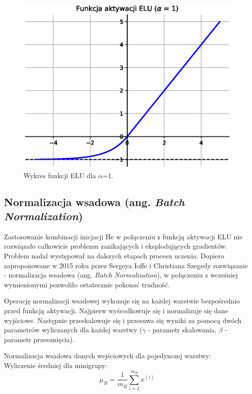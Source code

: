 \documentclass[a4paper,12pt]{article}
\numberwithin{figure}{section}
\begin{document}
    \begin{figure}[H]
        \centering
        \includegraphics[width=\textwidth]{elu}
        \caption{Wykres funkcji ELU dla $\alpha$=1.}
        \label{fig:elu}
    \end{figure}

    \subsection{Normalizacja wsadowa (ang. \textit{Batch Normalization})}

    Zastosowanie kombinacji inicjacji He w połączeniu z funkcją aktywacji ELU nie rozwiązało całkowicie problemu zanikających i eksplodujących gradientów. Problem nadal występował na dalszych etapach procesu uczenia. Dopiero zaproponowane w 2015 roku przez Sergeya Ioffe i Christiana Szegedy rozwiązanie - normalizacja wsadowa (ang. \textit{Batch Normalization}), w połączeniu z wcześniej wymienionymi pozwoliło ostatecznie pokonać trudność\cite{BatchNormalization2015}.

    \bigskip

    Operację normalizacji wsadowej wykonuje się na każdej warstwie bezpośrednio przed funkcją aktywacji. Najpierw wyśrodkowuje się i normalizuje się dane wyjściowe. Następnie przeskalowuje się i przesuwa się wyniki za pomocą dwóch parametrów wyliczanych dla każdej warstwy ($\gamma$ - parametr skalowania, $\beta$ - parametr przesunięcia)\cite{UczenieMaszynowe2018}.

    \bigskip

    \noindent
    \begin{minipage}[H]{\textwidth}
        \setlength\parindent{17pt} Normalizacja wsadowa danych wejściowych dla pojedynczej warstwy: \\
        \bigskip
        \setlength\parindent{17pt} Wyliczenie średniej dla minigrupy: \\
        \begin{equation}
            \label{eq:minibatch_mean}
            \mu_{B} = \frac{1}{m_{B}} \displaystyle\sum_{i=1}^{m_{B}} x^{(i)}
        \end{equation}
    \end{minipage}
\end{document}
